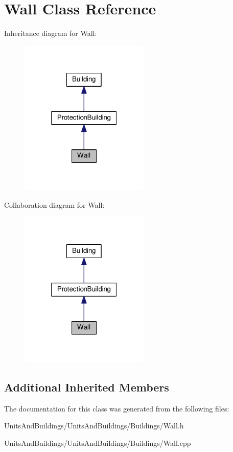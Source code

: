 \hypertarget{class_wall}{}\section{Wall Class Reference}
\label{class_wall}


Inheritance diagram for Wall\+:
\nopagebreak
\begin{figure}[H]
\begin{center}
\leavevmode
\includegraphics[width=175pt]{class_wall__inherit__graph}
\end{center}
\end{figure}


Collaboration diagram for Wall\+:
\nopagebreak
\begin{figure}[H]
\begin{center}
\leavevmode
\includegraphics[width=175pt]{class_wall__coll__graph}
\end{center}
\end{figure}
\subsection*{Additional Inherited Members}


The documentation for this class was generated from the following files\+:\begin{DoxyCompactItemize}
\item 
Units\+And\+Buildings/\+Units\+And\+Buildings/\+Buildings/Wall.\+h\item 
Units\+And\+Buildings/\+Units\+And\+Buildings/\+Buildings/Wall.\+cpp\end{DoxyCompactItemize}
